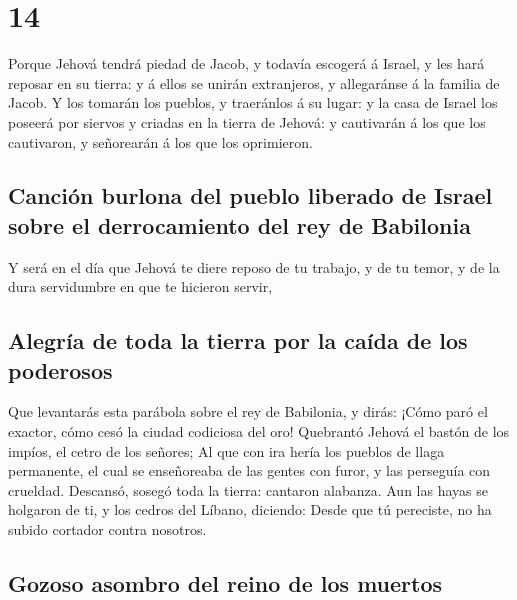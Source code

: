 \hypertarget{section-23-14}{%
\section{14}\label{section-23-14}}

 Porque Jehová tendrá piedad de Jacob, y todavía escogerá
á Israel, y les hará reposar en su tierra: y á ellos se unirán
extranjeros, y allegaránse á la familia de Jacob.  Y los
tomarán los pueblos, y traeránlos á su lugar: y la casa de Israel los
poseerá por siervos y criadas en la tierra de Jehová: y cautivarán á los
que los cautivaron, y señorearán á los que los oprimieron.

\hypertarget{canciuxf3n-burlona-del-pueblo-liberado-de-israel-sobre-el-derrocamiento-del-rey-de-babilonia}{%
\subsection{Canción burlona del pueblo liberado de Israel sobre el
derrocamiento del rey de
Babilonia}\label{canciuxf3n-burlona-del-pueblo-liberado-de-israel-sobre-el-derrocamiento-del-rey-de-babilonia}}

 Y será en el día que Jehová te diere reposo de tu
trabajo, y de tu temor, y de la dura servidumbre en que te hicieron
servir,

\hypertarget{alegruxeda-de-toda-la-tierra-por-la-cauxedda-de-los-poderosos}{%
\subsection{Alegría de toda la tierra por la caída de los
poderosos}\label{alegruxeda-de-toda-la-tierra-por-la-cauxedda-de-los-poderosos}}

 Que levantarás esta parábola sobre el rey de Babilonia, y
dirás: ¡Cómo paró el exactor, cómo cesó la ciudad codiciosa del oro!
 Quebrantó Jehová el bastón de los impíos, el cetro de los
señores;  Al que con ira hería los pueblos de llaga
permanente, el cual se enseñoreaba de las gentes con furor, y las
perseguía con crueldad.  Descansó, sosegó toda la tierra:
cantaron alabanza.  Aun las hayas se holgaron de ti, y los
cedros del Líbano, diciendo: Desde que tú pereciste, no ha subido
cortador contra nosotros.

\hypertarget{gozoso-asombro-del-reino-de-los-muertos}{%
\subsection{Gozoso asombro del reino de los
muertos}\label{gozoso-asombro-del-reino-de-los-muertos}}

